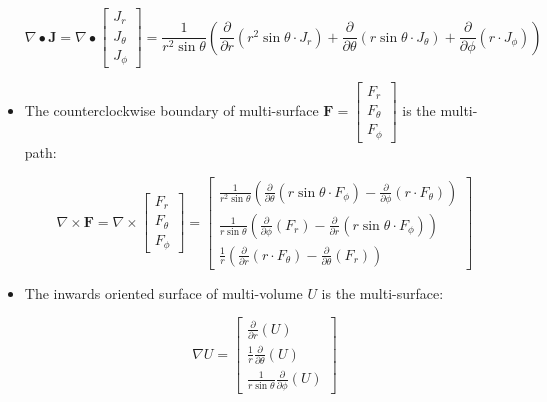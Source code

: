 \begin{itemize}
\[\nabla \bullet \mathbf{J} = \nabla \bullet \begin{bmatrix} J_r \\ J_\theta \\ J_\phi \end{bmatrix} = \frac{1}{r^2 \sin\theta}\left(\frac{\partial}{\partial r}(r^2 \sin\theta \cdot J_r) + \frac{\partial}{\partial \theta}(r \sin\theta \cdot J_\theta) + \frac{\partial}{\partial \phi}(r \cdot J_\phi)\right)\]
\item The counterclockwise boundary of multi-surface \(\mathbf{F} = \begin{bmatrix} F_r \\ F_\theta \\ F_\phi \end{bmatrix}\) is the multi-path:

\[\nabla \times \mathbf{F} = \nabla \times \begin{bmatrix} F_r \\ F_\theta \\ F_\phi \end{bmatrix} = \begin{bmatrix} 
\frac{1}{r^2\sin\theta}\left(\frac{\partial}{\partial \theta}(r\sin\theta \cdot F_\phi) - \frac{\partial}{\partial \phi}(r \cdot F_\theta) \right) \\ 
\frac{1}{r\sin\theta}\left(\frac{\partial}{\partial \phi}(F_r) - \frac{\partial}{\partial r}(r\sin\theta \cdot F_\phi)\right) \\ 
\frac{1}{r}\left(\frac{\partial}{\partial r}(r \cdot F_\theta) - \frac{\partial}{\partial \theta}(F_r)\right) \end{bmatrix}\]
\item The inwards oriented surface of multi-volume \(U\) is the multi-surface:

\[\nabla U = \begin{bmatrix} \frac{\partial}{\partial r}(U) \\ \frac{1}{r}\frac{\partial}{\partial \theta}(U) \\ \frac{1}{r\sin\theta}\frac{\partial}{\partial \phi}(U) \end{bmatrix}\]
\end{itemize}






